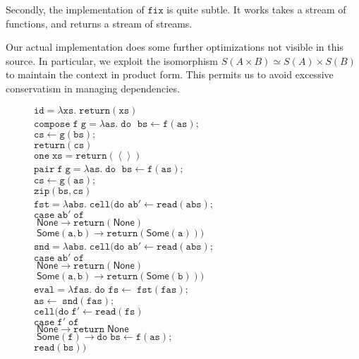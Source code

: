 \documentclass[preprint]{sigplanconf}
\newcommand{\term}[1]{\ensuremath{\mathtt{{#1}}}}
\newcommand{\unitval}{\left<\right>}
\newcommand{\None}{\mathsf{None}}
\newcommand{\Some}[1]{\mathsf{Some}({#1})}
\begin{document}
Secondly, the implementation of \term{fix} is quite subtle. It works
takes a stream of functions, and returns a stream of streams.

Our actual implementation does some further optimizations not visible
in this source. In particular, we exploit the isomorphism $S(A \times
B) \simeq S(A) \times S(B)$ to maintain the context in product form.
This permits us to avoid excessive conservatism in managing
dependencies.

\begin{figure}
\begin{tabbing}
\term{id = \lambda xs.\;return(xs)} 
\\[1em]

\term{compose\;f\;g =\lambda as.\; do\;}
 \=\term{bs \leftarrow f(as);} \\
 \>\term{cs \leftarrow g(bs);} \\
 \>\term{return(cs)} 
\\[1em]

\term{one\;xs = return(\unitval)}
\\[1em]

\term{pair\;f\;g = \lambda as.\;do\;}
  \=\term{bs \leftarrow f(as);} \\
  \>\term{cs \leftarrow g(as);} \\
  \>\term{zip(bs,cs)}
\\[1em]

\term{fst = \lambda abs.\;cell(do}
  \= \term{ab' \leftarrow read(abs);} \\
  \>\term{case \; ab'\; of} \\
  \>\term{\;\None \to return(\None)} \\
  \>\term{\;\Some{a,b} \to return(\Some{a}))} 
\\[1em]


\term{snd = \lambda abs.\;cell(do}
  \= \term{ab' \leftarrow read(abs);} \\
  \>\term{case \; ab'\; of} \\
  \>\term{\;\None \to return(\None)} \\
  \>\term{\;\Some{a,b} \to return(\Some{b}))} 
\\[1em]

\term{eval = \lambda fas.\;do}\;
              \=\term{fs \leftarrow \;fst(fas);}\\
              \>\term{as \leftarrow \;snd(fas);}\\
              \>\term{cell(do\;}\=\term{f' \leftarrow read(fs)}\\
              \>                  \>\term{case\;f'\;of}\\
              \>                  \>\term{\;\None \to return\;\None} \\
              \>                  \>\term{\;\Some{f} \to do\;}\=\term{bs \leftarrow f(as);} \\
              \>                  \>                            \>$\term{read(bs)})$ 
\\[1em]


\end{tabbing}
\end{figure}
\end{document}

